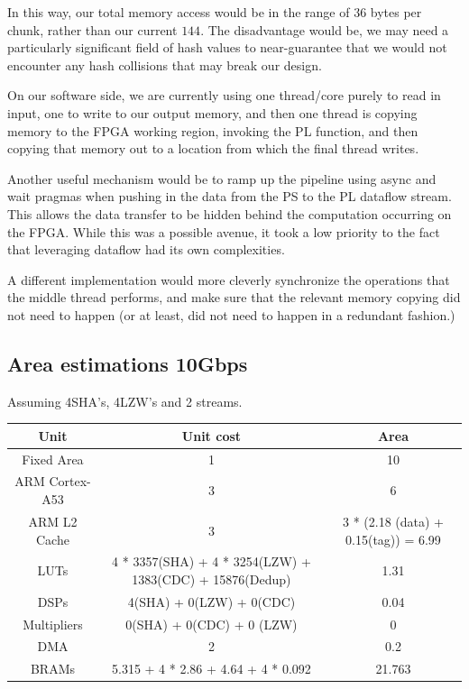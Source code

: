 \documentclass{article}
\begin{document}
\par
In this way, our total memory access would be in the range of $36$ bytes per chunk, rather than our current $144$. The disadvantage would be, we may need a particularly significant field of hash values to near-guarantee that we would not encounter any hash collisions that may break our design.
\newline\par
On our software side, we are currently using one thread/core purely to read in input, one to write to our output memory, and then one thread is copying memory to the FPGA working region, invoking the PL function, and then copying that memory out to a location from which the final thread writes.
\newline\par 
Another useful mechanism would be to ramp up the pipeline using async and wait pragmas when pushing in the data from the PS to the PL dataflow stream. This allows the data transfer to be hidden behind the computation occurring on the FPGA. While this was a possible avenue, it took a low priority to the fact that leveraging dataflow had its own complexities.
\newline\par
A different implementation would more cleverly synchronize the operations that the middle thread performs, and make sure that the relevant memory copying did not need to happen (or at least, did not need to happen in a redundant fashion.)

\subsection{Area estimations 10Gbps}
Assuming 4SHA's, 4LZW's and 2 streams.
\newline
\begin{center}
\begin{tabular}{ |c|c|c| } 
 \hline
 \textbf{Unit}  & \textbf{Unit cost} & \textbf{Area} \\ 
 \hline
 Fixed Area   &     1    & 10  \\
 \hline
 ARM Cortex-A53  & 3  & 6\\
 \hline
 ARM L2 Cache  &  3   &  3 * (2.18 (data) + 0.15(tag)) = 6.99\\
 \hline
 LUTs   &   4 * 3357(SHA) + 4 * 3254(LZW) + 1383(CDC) + 15876(Dedup)   &  1.31  \\
 \hline
 DSPs   &   4(SHA) + 0(LZW) + 0(CDC)    & 0.04\\
 \hline
 Multipliers    &   0(SHA) + 0(CDC) + 0 (LZW)   &   0\\
 \hline
 DMA    &   2 &   0.2\\
 \hline
 BRAMs  & 5.315 +  4 * 2.86 + 4.64 + 4 * 0.092  &   21.763\\
 \hline
 
\end{tabular}
\end{center}
\end{document}
